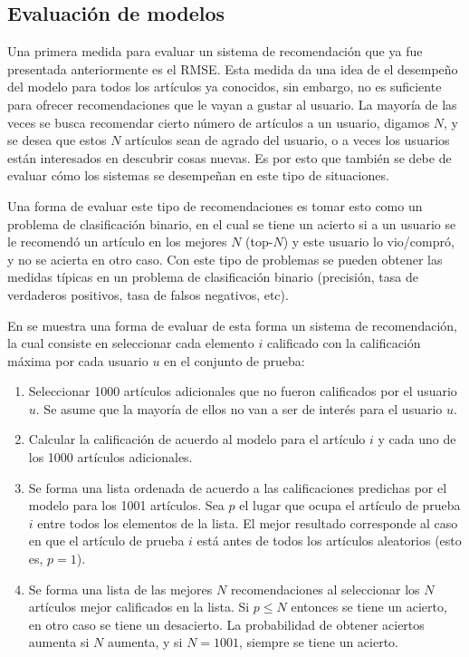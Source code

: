 \subsection{Evaluación de modelos}\label{sec:evaluacion_modelos}

Una primera medida para evaluar un sistema de recomendación que ya fue presentada anteriormente es el RMSE. Esta medida da una idea de el desempeño del modelo para todos los artículos ya conocidos, sin embargo, no es suficiente para ofrecer recomendaciones que le vayan a gustar al usuario. La mayoría de las veces se busca recomendar cierto número de artículos a un usuario, digamos $N$, y se desea que estos $N$ artículos sean de agrado del usuario, o a veces los usuarios están interesados en descubrir cosas nuevas. Es por esto que también se debe de evaluar cómo los sistemas se desempeñan en este tipo de situaciones.

Una forma de evaluar este tipo de recomendaciones es tomar esto como un problema de clasificación binario, en el cual se tiene un acierto si a un usuario se le recomendó un artículo en los mejores $N$ (top-$N$) y este usuario lo vio/compró, y no se acierta en otro caso. Con este tipo de problemas se pueden obtener las medidas típicas en un problema de clasificación binario (precisión, tasa de verdaderos positivos, tasa de falsos negativos, etc). 

En \cite{Cremonesi:2010:PRA:1864708.1864721} se muestra una forma de evaluar de esta forma un sistema de recomendación, la cual consiste en seleccionar cada elemento $i$ calificado con la calificación máxima por cada usuario $u$ en el conjunto de prueba:

\begin{enumerate}
  \item Seleccionar 1000 artículos adicionales que no fueron calificados por el usuario $u$. Se asume que la mayoría de ellos no van a ser de interés para el usuario $u$.
  \item Calcular la calificación de acuerdo al modelo para el artículo $i$ y cada uno de los 1000 artículos adicionales.
  \item Se forma una lista ordenada de acuerdo a las calificaciones predichas por el modelo para los 1001 artículos. Sea $p$ el lugar que ocupa el artículo de prueba $i$ entre todos los elementos de la lista. El mejor resultado corresponde al caso en que el artículo de prueba $i$ está antes de todos los artículos aleatorios (esto es, $p = 1$).
  \item Se forma una lista de las mejores $N$ recomendaciones al seleccionar los $N$ artículos mejor calificados en la lista. Si $p \leq N$ entonces se tiene un acierto, en otro caso se tiene un desacierto. La probabilidad de obtener aciertos aumenta si $N$ aumenta, y si $N = 1001$, siempre se tiene un acierto.
  
\end{enumerate}










